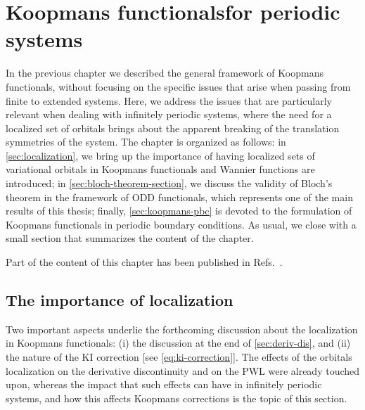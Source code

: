\cleardoublepage
\chapter[Koopmans functionals for periodic systems]{Koopmans functionals\break for periodic systems\label{ch:koopmans-periodic}}
In the previous chapter we described the general framework of Koopmans functionals, without focusing on the specific issues that arise when passing from finite to extended systems. Here, we address the issues that are particularly relevant when dealing with infinitely periodic systems, where the need for a localized set of orbitals brings about the apparent breaking of the translation symmetries of the system. The chapter is organized as follows: in \cref{sec:localization}, we bring up the importance of having localized sets of variational orbitals in Koopmans functionals and Wannier functions are introduced; in \cref{sec:bloch-theorem-section}, we discuss the validity of Bloch's theorem in the framework of ODD functionals, which represents one of the main results of this thesis; finally, \cref{sec:koopmans-pbc} is devoted to the formulation of Koopmans functionals in periodic boundary conditions. As usual, we close with a small section that summarizes the content of the chapter.

Part of the content of this chapter has been published in Refs.~\cite{de_gennaro_blochs_2022,colonna_koopmans_2022}.

\clearpage
\section{The importance of localization\label{sec:localization}}
Two important aspects underlie the forthcoming discussion about the localization in Koopmans functionals: (i) the discussion at the end of \cref{sec:deriv-dis}, and (ii) the nature of the KI correction [see \cref{eq:ki-correction}]. The effects of the orbitals localization on the derivative discontinuity and on the PWL were already touched upon, whereas the impact that such effects can have in infinitely periodic systems, and how this affects Koopmans corrections is the topic of this section.

